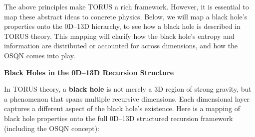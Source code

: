 \documentclass[]{article}
\begin{document}
The above principles make TORUS a rich framework. However, it is
essential to map these abstract ideas to concrete physics. Below, we
will map a black hole's properties onto the 0D--13D hierarchy, to see
how a black hole is described in TORUS theory. This mapping will clarify
how the black hole's entropy and information are distributed or
accounted for across dimensions, and how the OSQN comes into play.

\textbf{Black Holes in the 0D--13D Recursion Structure}

In TORUS theory, a \textbf{black hole} is not merely a 3D region of
strong gravity, but a phenomenon that spans multiple recursive
dimensions. Each dimensional layer captures a different aspect of the
black hole's existence. Here is a mapping of black hole properties onto
the full 0D--13D structured recursion framework (including the OSQN
concept):
\end{document}
